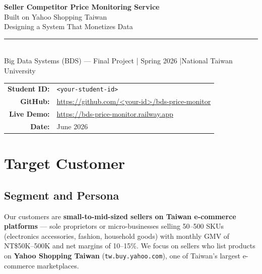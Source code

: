 \documentclass[11pt,a4paper]{article}
\begin{document}

\thispagestyle{empty}
\begin{center}
  \vspace*{2.5cm}
  {\LARGE\bfseries\color{ntublue}
    Seller Competitor Price Monitoring Service}\\[0.5em]
  {\large Built on Yahoo Shopping Taiwan}\\[0.3em]
  {\normalsize Designing a System That Monetizes Data}\\[1.5em]
  \rule{0.55\textwidth}{0.8pt}\\[1.2em]
  {\normalsize Big Data Systems (BDS) --- Final Project \quad|\quad
   Spring 2026 \quad|\quad National Taiwan University}\\[2.5cm]

  \begin{tabular}{rl}
    \textbf{Student ID:} & \texttt{<your-student-id>} \\[0.3em]
    \textbf{GitHub:}     & \url{https://github.com/<your-id>/bds-price-monitor} \\[0.3em]
    \textbf{Live Demo:}  & \url{https://bds-price-monitor.railway.app} \\[0.3em]
    \textbf{Date:}       & June 2026 \\
  \end{tabular}
\end{center}
\newpage

\section{Target Customer}

\subsection{Segment and Persona}

Our customers are \textbf{small-to-mid-sized sellers on Taiwan e-commerce platforms}
--- sole proprietors or micro-businesses selling 50--500 SKUs (electronics
accessories, fashion, household goods) with monthly GMV of NT\$50K--500K and
net margins of 10--15\%. We focus on sellers who list products on
\textbf{Yahoo Shopping Taiwan} (\texttt{tw.buy.yahoo.com}), one of Taiwan's
largest e-commerce marketplaces.
\end{document}
